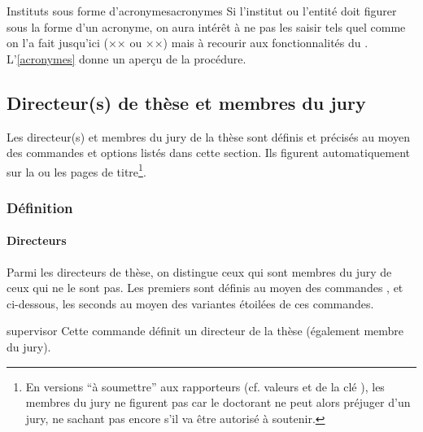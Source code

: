 %
\begin{dbremark}{Instituts sous forme d'acronymes}{acronymes}
  Si l'institut ou l'entité doit figurer sous la forme d'un acronyme, on aura
  intérêt à ne pas les saisir tels quel comme on l'a fait jusqu'ici
  (×× ou ××) mais à recourir aux
  fonctionnalités du . L'\vref{acronymes} donne un aperçu
  de la procédure.
\end{dbremark}

\subsection{Directeur(s) de thèse et membres du jury}\label{sec:jury}

Les directeur(s) et membres du jury de la thèse sont définis et précisés au
moyen des commandes et options listés dans cette section. Ils figurent
automatiquement sur la ou les pages de titre\footnote{En versions \enquote{à
    soumettre} aux rapporteurs (cf. valeurs \protect{} et
  \protect{} de la clé \protect{}), les
  membres du jury ne figurent pas car le doctorant ne peut alors préjuger d'un
  jury, ne sachant pas encore s'il va être autorisé à soutenir.}.

\subsubsection{Définition}\label{sec:definition-directeurs-jury}

\paragraph{Directeurs}\label{sec:definition-directeurs}


Parmi les directeurs de thèse, on distingue ceux qui sont membres du jury de
ceux qui ne le sont pas. Les premiers sont définis au moyen des commandes
,  et  ci-dessous,
les seconds au moyen des variantes étoilées de ces commandes.

\begin{docCommand}[doc
  description=\mandatory]{supervisor}{}
  Cette commande définit un directeur de la thèse (également membre du jury).
\end{docCommand}

